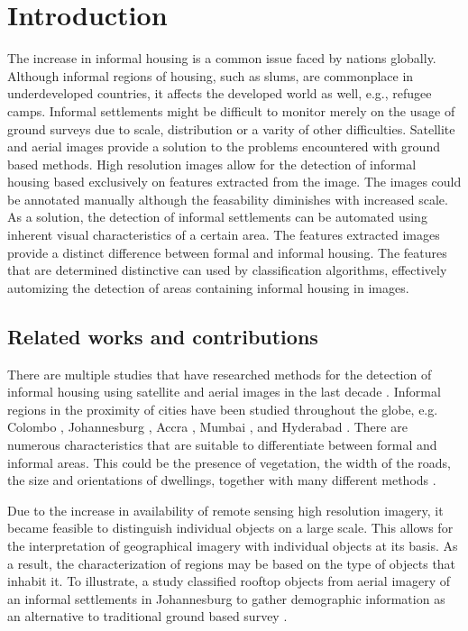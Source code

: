\section{Introduction}

The increase in informal housing is a common issue faced by nations globally.
Although informal regions of housing, such as slums, are commonplace in
underdeveloped countries, it affects the developed world as well, e.g., refugee
camps. Informal settlements might be difficult to monitor merely on the usage
of ground surveys due to scale, distribution or a varity of other difficulties.
Satellite and aerial images provide a solution to the problems encountered with
ground based methods.  High resolution images allow for the detection of
informal housing based exclusively on features extracted from the image.  The
images could be annotated manually although the feasability diminishes with
increased scale.  As a solution, the detection of informal settlements can be
automated using inherent visual characteristics of a certain area. The features
extracted images provide a distinct difference between formal and informal
housing. The features that are determined distinctive can used by classification
algorithms, effectively automizing the detection of areas containing informal
housing in images.

\subsection{Related works and contributions}

There are multiple studies that have researched methods for the detection of informal
housing using satellite and aerial images in the last decade \cite{kuffer2016slums}.
Informal regions in the proximity of cities have been studied throughout
the globe, e.g. Colombo \cite{colombo},
Johannesburg \cite{williams2016automatic}, Accra \cite{accra}, Mumbai
\cite{mumbai}, and Hyderabad \cite{hyderabad}. There are numerous
characteristics that are suitable to differentiate between formal and informal
areas. This could be the presence of vegetation, the width of
the roads, the size and orientations of dwellings, together with many different
methods \cite{owen2013approach}.

Due to the increase in availability of remote sensing high resolution imagery, it became
feasible to distinguish individual objects on a large scale.  This allows for
the interpretation of geographical imagery with individual objects at its
basis.  As a result, the characterization of regions may be based on the type
of objects that inhabit it.  To illustrate, a study classified rooftop objects
from aerial imagery of an informal settlements in Johannesburg to gather
demographic information as an alternative to traditional ground based survey
\cite{williams2016automatic}.

